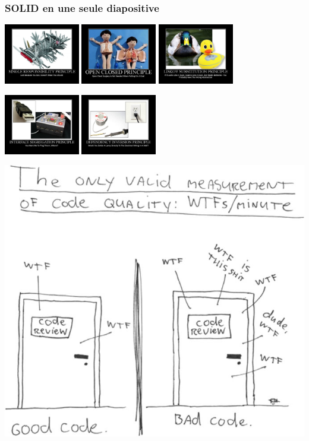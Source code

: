 \begin{frame}
    \frametitle{SOLID en une seule diapositive}

    \centering
    \includegraphics[height=100px]{figures/pratiques/srp}
    \includegraphics[height=100px]{figures/pratiques/ocp}
    \includegraphics[height=100px]{figures/pratiques/lsp}

    \includegraphics[height=100px]{figures/pratiques/isp}
    \includegraphics[height=100px]{figures/pratiques/dip}

\end{frame}


\begin{frame}
    \centering
    \includegraphics[height=0.5\linewidth]{figures/pratiques/wtf}
\end{frame}
